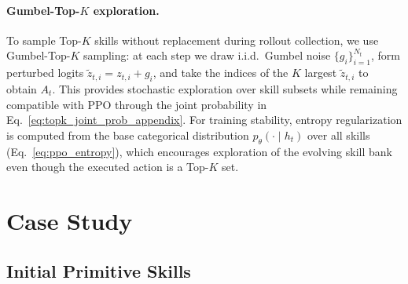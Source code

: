 \paragraph{Gumbel-Top-$K$ exploration.}
To sample Top-$K$ skills without replacement during rollout collection, we use Gumbel-Top-$K$ sampling: at each step we draw i.i.d.\ Gumbel noise $\{g_i\}_{i=1}^{N_t}$, form perturbed logits $\tilde{z}_{t,i}=z_{t,i}+g_i$, and take the indices of the $K$ largest $\tilde{z}_{t,i}$ to obtain $A_t$.
This provides stochastic exploration over skill subsets while remaining compatible with PPO through the joint probability in Eq.~\ref{eq:topk_joint_prob_appendix}.
For training stability, entropy regularization is computed from the base categorical distribution $p_\theta(\cdot\mid h_t)$ over all skills (Eq.~\ref{eq:ppo_entropy}), which encourages exploration of the evolving skill bank even though the executed action is a Top-$K$ set.










\section{Case Study}
\label{appendix:case_study}





\subsection{Initial Primitive Skills}


